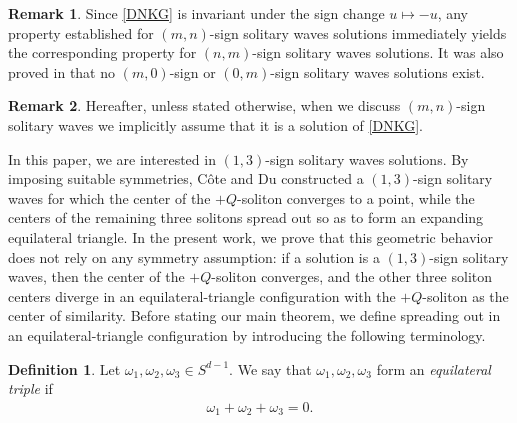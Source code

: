 \documentclass[reqno]{amsart}
\theoremstyle{plain}
\theoremstyle{definition}
\newtheorem{definition}{Definition}[section]
\newtheorem{remark}{Remark}[section]
\numberwithin{equation}{section}
\newcommand{\1}{\mathbbm{1}}
\begin{document}
\begin{remark}
Since \eqref{DNKG} is invariant under the sign change $u\mapsto -u$, any property established for $(m,n)$-sign solitary waves solutions immediately yields the corresponding property for $(n,m)$-sign solitary waves solutions. It was also proved in \cite{CD} that no $(m,0)$-sign or $(0,m)$-sign solitary waves solutions exist.
\end{remark}
\begin{remark}
Hereafter, unless stated otherwise, when we discuss $(m,n)$-sign solitary waves we implicitly assume that it is a solution of \eqref{DNKG}.
\end{remark}


In this paper, we are interested in $(1,3)$-sign solitary waves solutions. By imposing suitable symmetries, C\^{o}te and Du \cite{CD} constructed a $(1,3)$-sign solitary waves for which the center of the $+Q$-soliton converges to a point, while the centers of the remaining three solitons spread out so as to form an expanding equilateral triangle. In the present work, we prove that this geometric behavior does not rely on any symmetry assumption: if a solution is a $(1,3)$-sign solitary waves, then the center of the $+Q$-soliton converges, and the other three soliton centers diverge in an equilateral-triangle configuration with the $+Q$-soliton as the center of similarity.
Before stating our main theorem, we define spreading out in an equilateral-triangle configuration by introducing the following terminology.
\begin{definition}\label{seisankakukei}
Let $\omega_1,\omega_2,\omega_3\in S^{d-1}$. We say that $\omega_1,\omega_2,\omega_3$ form an \textit{equilateral triple} if
\begin{align*}
\omega_1+\omega_2+\omega_3=0.
\end{align*}
\end{definition}
\end{document}
